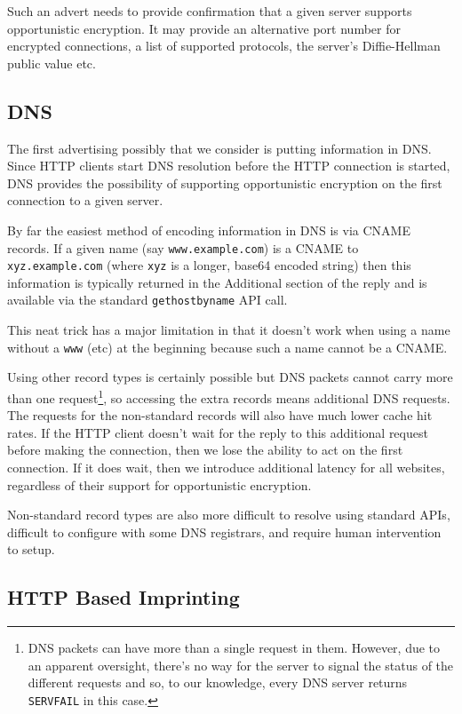 \documentclass[conference]{IEEEtran}
\begin{document}
Such an advert needs to provide confirmation that a given server supports
opportunistic encryption. It may provide an alternative port number for
encrypted connections, a list of supported protocols, the server's
Diffie-Hellman public value etc.

\subsection{DNS}

The first advertising possibly that we consider is putting information in DNS.
Since HTTP clients start DNS resolution before the HTTP connection is started,
DNS provides the possibility of supporting opportunistic encryption on the
first connection to a given server.

By far the easiest method of encoding information in DNS is via CNAME records.
If a given name (say {\tt www.example.com}) is a CNAME to {\tt xyz.example.com}
(where {\tt xyz} is a longer, base64 encoded string) then this information is
typically returned in the Additional section of the reply\cite{rfc1035} and is
available via the standard {\tt gethostbyname} API call.

This neat trick has a major limitation in that it doesn't work when using a
name without a {\tt www} (etc) at the beginning because such a name cannot be a
CNAME.

Using other record types is certainly possible but DNS packets cannot
carry more than one request\footnote{DNS packets can have more than a single
request in them. However, due to an apparent oversight, there's no way for the
server to signal the status of the different requests and so, to our knowledge,
every DNS server returns {\tt SERVFAIL} in this case.}, so accessing the extra
records means additional DNS requests. The requests for the non-standard
records will also have much lower cache hit rates. If the HTTP client doesn't
wait for the reply to this additional request before making the connection,
then we lose the ability to act on the first connection. If it does wait, then
we introduce additional latency for all websites, regardless of their support
for opportunistic encryption.

Non-standard record types are also more difficult to resolve using standard
APIs, difficult to configure with some DNS registrars, and require human
intervention to setup.

\subsection{HTTP Based Imprinting}
\end{document}
